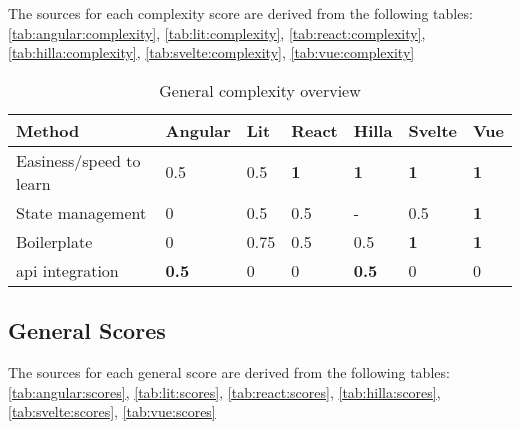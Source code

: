 The sources for each complexity score are derived from the following tables: \autoref{tab:angular:complexity}, \autoref{tab:lit:complexity}, \autoref{tab:react:complexity}, \autoref{tab:hilla:complexity}, \autoref{tab:svelte:complexity}, \autoref{tab:vue:complexity}


\begin{table}[H]
    \centering
    \begin{tabular}{|l|l|l|l|l|l|l|}
        \hline
        \textbf{Method}            & Angular      & Lit  & React      & Hilla        & Svelte     & Vue        \\
        \hline
        Easiness/speed to learn    & 0.5          & 0.5  & \textbf{1} & \textbf{1}   & \textbf{1} & \textbf{1} \\ \hline
        State management           & 0            & 0.5  & 0.5        & -            & 0.5        & \textbf{1} \\ \hline
        Boilerplate                & 0            & 0.75 & 0.5        & 0.5          & \textbf{1} & \textbf{1} \\ \hline
        \acrshort{api} integration & \textbf{0.5} & 0    & 0          & \textbf{0.5} & 0          & 0          \\ \hline
    \end{tabular}
    \caption{General complexity overview}
    \label{tab:conclusion:complexity}
\end{table}

\subsection{General Scores}

The sources for each general score are derived from the following tables: \autoref{tab:angular:scores}, \autoref{tab:lit:scores}, \autoref{tab:react:scores}, \autoref{tab:hilla:scores}, \autoref{tab:svelte:scores}, \autoref{tab:vue:scores}

